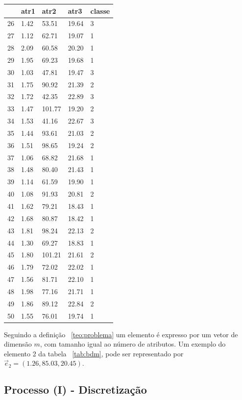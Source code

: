 \begin{table}[!ht]
\begin{tabular}{ |lllll| }
\hline
  & atr1 & atr2 & atr3 & classe \\ \hline
26 & 1.42 & 53.51 & 19.64 & 3 \\ \hline
27 & 1.12 & 62.71 & 19.07 & 1 \\ \hline
28 & 2.09 & 60.58 & 20.20 & 1 \\ \hline
29 & 1.95 & 69.23 & 19.68 & 1 \\ \hline
30 & 1.03 & 47.81 & 19.47 & 3 \\ \hline
31 & 1.75 & 90.92 & 21.39 & 2 \\ \hline
32 & 1.72 & 42.35 & 22.89 & 3 \\ \hline
33 & 1.47 & 101.77 & 19.20 & 2 \\ \hline
34 & 1.53 & 41.16 & 22.67 & 3 \\ \hline
35 & 1.44 & 93.61 & 21.03 & 2 \\ \hline
36 & 1.51 & 98.65 & 19.24 & 2 \\ \hline
37 & 1.06 & 68.82 & 21.68 & 1 \\ \hline
38 & 1.48 & 80.40 & 21.43 & 1 \\ \hline
39 & 1.14 & 61.59 & 19.90 & 1 \\ \hline
40 & 1.08 & 91.93 & 20.81 & 2 \\ \hline
41 & 1.62 & 79.21 & 18.43 & 1 \\ \hline
42 & 1.68 & 80.87 & 18.42 & 1 \\ \hline
43 & 1.81 & 98.24 & 22.13 & 2 \\ \hline
44 & 1.30 & 69.27 & 18.83 & 1 \\ \hline
45 & 1.80 & 101.21 & 21.61 & 2 \\ \hline
46 & 1.79 & 72.02 & 22.02 & 1 \\ \hline
47 & 1.56 & 81.71 & 22.10 & 1 \\ \hline
48 & 1.98 & 77.16 & 21.71 & 1 \\ \hline
49 & 1.86 & 89.12 & 22.84 & 2 \\ \hline
50 & 1.55 & 76.01 & 19.74 & 1 \\ \hline
\end{tabular}
\end{table}

Seguindo a definição ~\ref{teo:problema} um elemento é expresso por um vetor  de dimensão ${m}$, com tamanho igual ao número de atributos. Um exemplo do elemento 2 da tabela ~\ref{tab:bdm}, pode ser representado por ${\vec{e}_{2}=(1.26,85.03, 20.45)}$.

\subsection{Processo (I) - Discretização}

